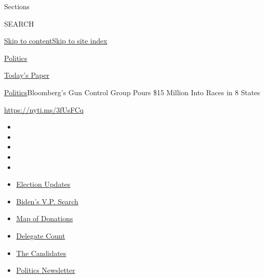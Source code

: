 Sections

SEARCH

\protect\hyperlink{site-content}{Skip to
content}\protect\hyperlink{site-index}{Skip to site index}

\href{https://www.nytimes3xbfgragh.onion/section/politics}{Politics}

\href{https://myaccount.nytimes3xbfgragh.onion/auth/login?response_type=cookie\&client_id=vi}{}

\href{https://www.nytimes3xbfgragh.onion/section/todayspaper}{Today's
Paper}

\href{/section/politics}{Politics}\textbar{}Bloomberg's Gun Control
Group Pours \$15 Million Into Races in 8 States

\url{https://nyti.ms/3fUsFCq}

\begin{itemize}
\item
\item
\item
\item
\item
\end{itemize}

\begin{itemize}
\item
  \href{https://www.nytimes3xbfgragh.onion/2020/08/04/us/elections/primary-election-michigan-arizona-kansas.html?action=click\&pgtype=Article\&state=default\&region=TOP_BANNER\&context=storylines_menu}{Election
  Updates}
\item
  \href{https://www.nytimes3xbfgragh.onion/article/biden-vice-president-2020.html?action=click\&pgtype=Article\&state=default\&region=TOP_BANNER\&context=storylines_menu}{Biden's
  V.P. Search}
\item
  \href{https://www.nytimes3xbfgragh.onion/interactive/2020/07/24/us/politics/trump-biden-campaign-donors.html?action=click\&pgtype=Article\&state=default\&region=TOP_BANNER\&context=storylines_menu}{Map
  of Donations}
\item
  \href{https://www.nytimes3xbfgragh.onion/interactive/2020/us/elections/delegate-count-primary-results.html?action=click\&pgtype=Article\&state=default\&region=TOP_BANNER\&context=storylines_menu}{Delegate
  Count}
\item
  \href{https://www.nytimes3xbfgragh.onion/interactive/2019/us/politics/2020-presidential-candidates.html?action=click\&pgtype=Article\&state=default\&region=TOP_BANNER\&context=storylines_menu}{The
  Candidates}
\item
  \href{https://www.nytimes3xbfgragh.onion/newsletters/politics?action=click\&pgtype=Article\&state=default\&region=TOP_BANNER\&context=storylines_menu}{Politics
  Newsletter}
\end{itemize}

